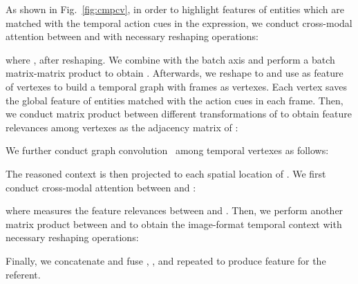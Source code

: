\documentclass[10pt,journal,cspaper,compsoc]{IEEEtran}
\begin{document}
As shown in Fig.~\ref{fig:cmpcv}, in order to highlight features of entities which are matched with the temporal action cues in the expression, we conduct cross-modal attention between  and  with necessary reshaping operations:



where ,  after reshaping. We combine  with the batch axis and perform a batch matrix-matrix product to obtain .
Afterwards, we reshape  to  and use  as feature of vertexes to build a temporal graph  with  frames as vertexes. 
Each vertex saves the global feature of entities matched with the action cues in each frame.
Then, we conduct matrix product between different transformations of  to obtain feature relevances among vertexes as the adjacency matrix  of : 


We further conduct graph convolution~\cite{kipf2016semi} among temporal vertexes as follows: 

The reasoned context  is then projected to each spatial location of . 
We first conduct cross-modal attention between  and : 


where  measures the feature relevances between  and . 
Then, we perform another matrix product between  and  to obtain the image-format temporal context  with necessary reshaping operations: 

Finally, we concatenate and fuse , ,  and repeated  to produce feature  for the referent.
\end{document}
